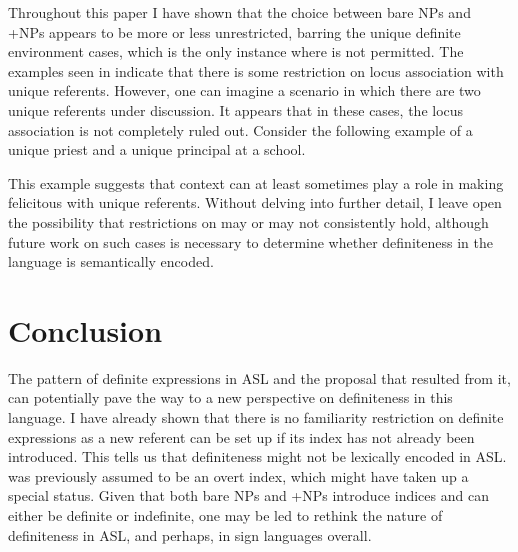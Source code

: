 \documentclass[output=paper,
modfonts
]{langscibook}
\begin{document}
Throughout this paper I have shown that the choice between bare NPs and +NPs appears to be more or less unrestricted, barring the unique definite environment cases, which is the only instance where  is not permitted. The examples seen in  indicate that there is some restriction on locus association with unique referents. However, one can imagine a scenario in which there are two unique referents under discussion. It appears that in these cases, the locus association is not completely ruled out. Consider the following example of a unique priest and a unique principal at a school. 

\begin{exe} 
	
	
\end{exe} 

\noindent This example suggests that context can at least sometimes play a role in making  felicitous with unique referents. Without delving into further detail, I leave open the possibility that  restrictions on  may or may not consistently hold, although future work on such cases is necessary to determine whether definiteness in the language is semantically encoded.  

\section{Conclusion}

The pattern of definite expressions in ASL and the proposal that resulted from it, can potentially pave the way to a new perspective on definiteness in this language. I have already shown that there is no familiarity restriction on definite expressions as a new referent can be set up if its index has not already been introduced. This tells us that definiteness might not be lexically encoded in ASL.  was previously assumed to be an overt index, which might have taken up a special status. Given that both bare NPs and +NPs introduce indices and can either be definite or indefinite, one may be led to rethink the nature of definiteness in ASL, and perhaps, in sign languages overall. 
\end{document}
